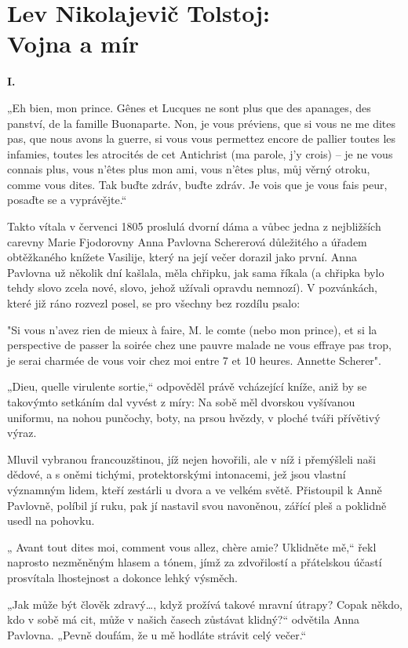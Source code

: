 \section{Lev Nikolajevič Tolstoj: \\ Vojna a mír}

\noindent
\textbf{I.}

\noindent
„Eh bien, mon prince. Gênes et Lucques ne sont plus que des apanages, des panství, de la famille Buonaparte. Non, je vous préviens, que si vous ne me dites pas, que nous avons la guerre, si vous vous permettez encore de pallier toutes les infamies, toutes les atrocités de cet Antichrist (ma parole, j'y crois) – je ne vous connais plus, vous n'êtes plus mon ami, vous n'êtes plus, můj věrný otroku, comme vous dites. Tak buďte zdráv, buďte zdráv. Je vois que je vous fais peur, posaďte se a vyprávějte.“

Takto vítala v červenci 1805 proslulá dvorní dáma a vůbec jedna z nejbližších carevny Marie Fjodorovny Anna Pavlovna Schererová důležitého a úřadem obtěžkaného knížete Vasilije, který na její večer dorazil jako první. Anna Pavlovna už několik dní kašlala, měla chřipku, jak sama říkala (a chřipka bylo tehdy slovo zcela nové, slovo, jehož užívali opravdu nemnozí). V pozvánkách, které již ráno rozvezl posel, se pro všechny bez rozdílu psalo:

"Si vous n'avez rien de mieux à faire, M. le comte (nebo mon prince), et si la perspective de passer la soirée chez une pauvre malade ne vous effraye pas trop, je serai charmée de vous voir chez moi entre 7 et 10 heures. Annette Scherer".

„Dieu, quelle virulente sortie,“ odpověděl právě vcházející kníže, aniž by se takovýmto setkáním dal vyvést z míry: Na sobě měl dvorskou vyšívanou uniformu, na nohou punčochy, boty, na prsou hvězdy, v ploché tváři přívětivý výraz.

Mluvil vybranou francouzštinou, jíž nejen hovořili, ale v níž i přemýšleli naši dědové, a s oněmi tichými, protektorskými intonacemi, jež jsou vlastní významným lidem, kteří zestárli u dvora a ve velkém světě. Přistoupil k Anně Pavlovně, políbil jí ruku, pak jí nastavil svou navoněnou, zářící pleš a poklidně usedl na pohovku.

„ Avant tout dites moi, comment vous allez, chère amie? Uklidněte mě,“ řekl naprosto nezměněným hlasem a tónem, jímž za zdvořilostí a přátelskou účastí prosvítala lhostejnost a dokonce lehký výsměch.

„Jak může být člověk zdravý…, když prožívá takové mravní útrapy? Copak někdo, kdo v sobě má cit, může v našich časech zůstávat klidný?“ odvětila Anna Pavlovna. „Pevně doufám, že u mě hodláte strávit celý večer.“

